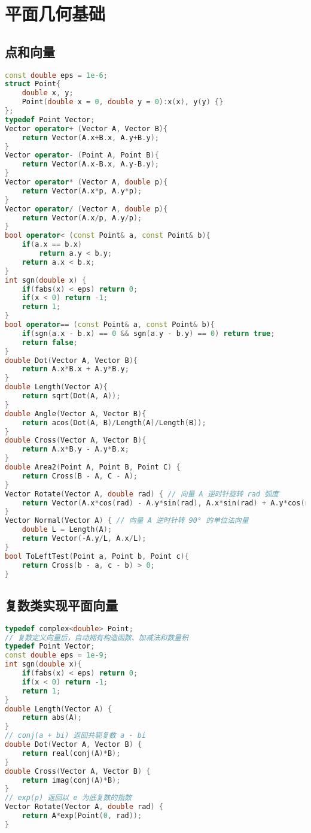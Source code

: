 

\section{平面几何基础}

\subsection{点和向量}

\begin{lstlisting}[language=C++]
const double eps = 1e-6;
struct Point{
    double x, y;
    Point(double x = 0, double y = 0):x(x), y(y) {}
};
typedef Point Vector;
Vector operator+ (Vector A, Vector B){
    return Vector(A.x+B.x, A.y+B.y);
}
Vector operator- (Point A, Point B){
    return Vector(A.x-B.x, A.y-B.y);
}
Vector operator* (Vector A, double p){
    return Vector(A.x*p, A.y*p);
}
Vector operator/ (Vector A, double p){
    return Vector(A.x/p, A.y/p);
}
bool operator< (const Point& a, const Point& b){
    if(a.x == b.x)
        return a.y < b.y;
    return a.x < b.x;
}
int sgn(double x) {
    if(fabs(x) < eps) return 0;
    if(x < 0) return -1;
    return 1;
}
bool operator== (const Point& a, const Point& b){
    if(sgn(a.x - b.x) == 0 && sgn(a.y - b.y) == 0) return true;
    return false;
}
double Dot(Vector A, Vector B){
    return A.x*B.x + A.y*B.y;
}
double Length(Vector A){
    return sqrt(Dot(A, A));
}
double Angle(Vector A, Vector B){
    return acos(Dot(A, B)/Length(A)/Length(B));
}
double Cross(Vector A, Vector B){
    return A.x*B.y - A.y*B.x;
}
double Area2(Point A, Point B, Point C) {
    return Cross(B - A, C - A);
}
Vector Rotate(Vector A, double rad) { // 向量 A 逆时针旋转 rad 弧度
    return Vector(A.x*cos(rad) - A.y*sin(rad), A.x*sin(rad) + A.y*cos(rad));
}
Vector Normal(Vector A) { // 向量 A 逆时针转 90° 的单位法向量
    double L = Length(A);
    return Vector(-A.y/L, A.x/L);
}
bool ToLeftTest(Point a, Point b, Point c){
    return Cross(b - a, c - b) > 0;
}
\end{lstlisting}

\subsection{复数类实现平面向量}

\begin{lstlisting}[language=C++]
typedef complex<double> Point;
// 复数定义向量后，自动拥有构造函数、加减法和数量积
typedef Point Vector; 
const double eps = 1e-9;
int sgn(double x){
    if(fabs(x) < eps) return 0;
    if(x < 0) return -1;
    return 1;
}
double Length(Vector A) {
    return abs(A);
}
// conj(a + bi) 返回共轭复数 a - bi
double Dot(Vector A, Vector B) {
    return real(conj(A)*B);
}
double Cross(Vector A, Vector B) {
    return imag(conj(A)*B);
}
// exp(p) 返回以 e 为底复数的指数
Vector Rotate(Vector A, double rad) {
    return A*exp(Point(0, rad));
}
\end{lstlisting}

